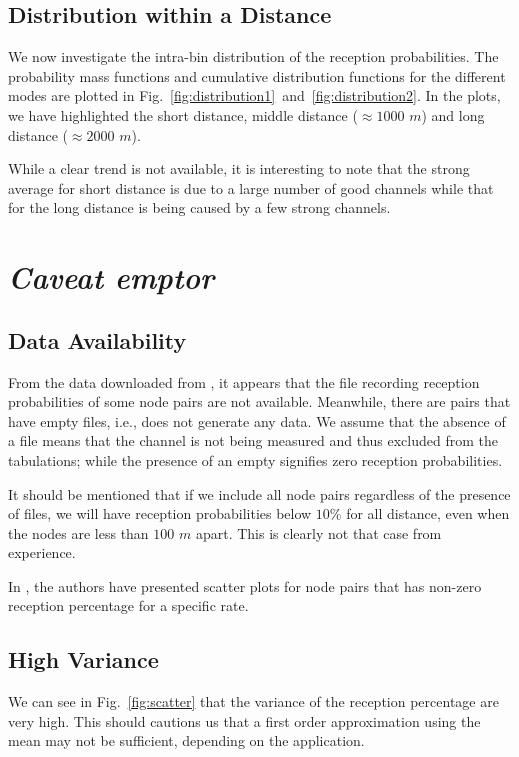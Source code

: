 \documentclass[11pt,twocolumn]{article}
\begin{document}
\subsection{Distribution within a Distance}
We now investigate the intra-bin distribution of the reception probabilities.  The probability mass functions and cumulative distribution functions for the different modes are plotted in Fig.~\ref{fig:distribution1}~and~\ref{fig:distribution2}.  In the plots, we have highlighted the short distance, middle distance ($\approx 1000$ $m$) and long distance ($\approx 2000$ $m$).

While a clear trend is not available, it is interesting to note that the strong average for short distance is due to a large number of good channels while that for the long distance is being caused by a few strong channels.

\section{\textit{Caveat emptor}}
\subsection{Data Availability}
From the data downloaded from \cite{roofnetdata}, it appears that the file recording reception probabilities of some node pairs are not available.  Meanwhile, there are pairs that have empty files, i.e., does not generate any data.  We assume that the absence of a file means that the channel is not being measured and thus excluded from the tabulations; while the presence of an empty signifies zero reception probabilities.

It should be mentioned that if we include all node pairs regardless of the presence of files, we will have reception probabilities below $10 \%$ for all distance, even when the nodes are less than $100$ $m$ apart.  This is clearly not that case from experience.

In \cite{Aguayo:2004lr}, the authors have presented scatter plots for node pairs that has non-zero reception percentage for a specific rate.

\subsection{High Variance}
We can see in Fig.~\ref{fig:scatter} that the variance of the reception percentage are very high.  This should cautions us that a first order approximation using the mean may not be sufficient, depending on the application.
\end{document}
